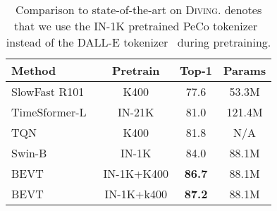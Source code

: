 \documentclass[10pt,twocolumn,letterpaper]{article}
\newcommand{\diving}{{\scshape Diving\-48}\xspace}
\newcommand{\ra}[1]{\renewcommand{\arraystretch}{#1}}
\begin{document}
\begin{table}[]
  \centering
  \ra{1.0}
    \setlength{\tabcolsep}{0pt} \begin{tabular*}{\linewidth}{@{\extracolsep{\fill}}lccc@{}}
    \toprule
    Method & Pretrain & Top-1 & Params \\
    \midrule
    SlowFast R101~\cite{slowfast} & K400 & 77.6 & 53.3M \\
    TimeSformer-L~\cite{gberta_2021_ICML} & IN-21K & 81.0 & 121.4M \\
    TQN~\cite{zhang2021temporal} & K400 & 81.8 & N/A \\
    Swin-B~\cite{liu2021video} & IN-1K & 84.0 & 88.1M \\
    \midrule
BEVT & IN-1K+K400 & \textbf{86.7} & 88.1M \\
    BEVT  & IN-1K+k400 & \textbf{87.2} & 88.1M \\
    \bottomrule
  \end{tabular*}
  \caption{Comparison to state-of-the-art on \diving.  denotes that we use the IN-1K pretrained PeCo tokenizer~\cite{dong2021peco} instead of the DALL-E tokenizer~\cite{dalle} during pretraining.}
  \label{tab:diving48}
  \vspace{-1em}
\end{table}
\end{document}
